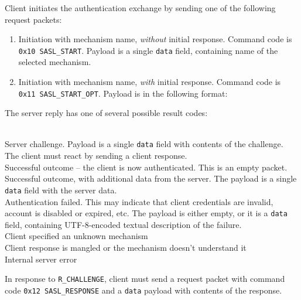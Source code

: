 Client initiates the authentication exchange by sending one of the following request packets:

\begin{enumerate}

\item Initiation with mechanism name, {\it without} initial response. Command code is {\tt 0x10 SASL\_START}.
Payload is a single {\tt data} field, containing name of the selected mechanism.

\item Initiation with mechanism name, {\it with} initial response. Command code is {\tt 0x11 SASL\_START\_OPT}.
Payload is in the following format:

\beginpk
\endpk
\end{enumerate}

The server reply has one of several possible result codes:
\begin{description}
	 \hfill \\
		Server challenge. Payload is a single {\tt data} field with contents of the challenge. The
		client must react by sending a client response.
	 \hfill \\
		Successful outcome -- the client is now authenticated. This is an empty packet.
	 \hfill \\
		Successful outcome, with additional data from the server. The payload is a single {\tt data}
		field with the server data.
	 \hfill \\
		Authentication failed. This may indicate that client credentials are invalid, account is
		disabled or expired, etc. The payload is either empty, or it is a {\tt data} field, containing
		UTF-8-encoded textual description of the failure.
	 \hfill \\
		Client specified an unknown mechanism
	 \hfill \\
		Client response is mangled or the mechanism doesn't understand it
	 \hfill \\
		Internal server error
\end{description}

In response to {\tt R\_CHALLENGE}, client must send a request packet with command code {\tt 0x12
SASL\_RESPONSE} and a {\tt data} payload with contents of the response.


